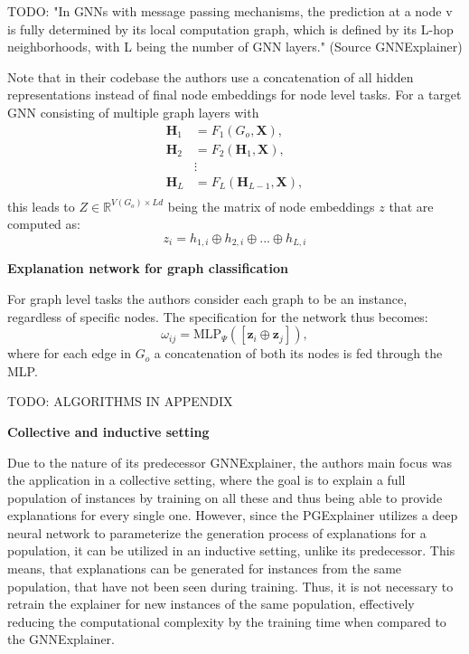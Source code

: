 TODO: "In GNNs with message passing mechanisms, the prediction at a node v is fully determined by its local computation graph, which is defined by its L-hop neighborhoods, with L being the number of GNN layers." (Source GNNExplainer)

Note that in their codebase the authors use a concatenation of all hidden representations instead of final node embeddings for node level tasks.
For a target GNN consisting of multiple graph layers with
\begin{align*}
    \mathbf{H}_1 &= F_1(G_o, \mathbf{X}), \\
    \mathbf{H}_2 &= F_2(\mathbf{H}_1, \mathbf{X}), \\
    &\vdots \\
    \mathbf{H}_L &= F_L(\mathbf{H}_{L-1}, \mathbf{X}), \\
\end{align*}
this leads to $Z \in \mathbb{R}^{V(G_o)\times Ld}$ being the matrix of node embeddings $z$ that are computed as:
\begin{equation}
    z_i = h_{1,i} \oplus h_{2,i} \oplus ... \oplus h_{L,i}
\end{equation}

\textbf{Explanation network for graph classification}

For graph level tasks the authors consider each graph to be an instance, regardless of specific nodes. The specification for the network thus becomes:
\begin{equation}
    \omega_{ij} = \text{MLP}_\Psi ([\mathbf{z}_i\oplus\mathbf{z}_j]),
\end{equation}
where for each edge in $G_o$ a concatenation of both its nodes is fed through the MLP.\bigskip

TODO: ALGORITHMS IN APPENDIX

\textbf{Collective and inductive setting}

Due to the nature of its predecessor GNNExplainer, the authors main focus was the application in a collective setting, where the goal is to explain a full population of instances by training on all these and thus being able to provide explanations for every single one. However, since the PGExplainer utilizes a deep neural network to parameterize the generation process of explanations for a population, it can be utilized in an inductive setting, unlike its predecessor. This means, that explanations can be generated for instances from the same population, that have not been seen during training. Thus, it is not necessary to retrain the explainer for new instances of the same population, effectively reducing the computational complexity by the training time when compared to the GNNExplainer.


